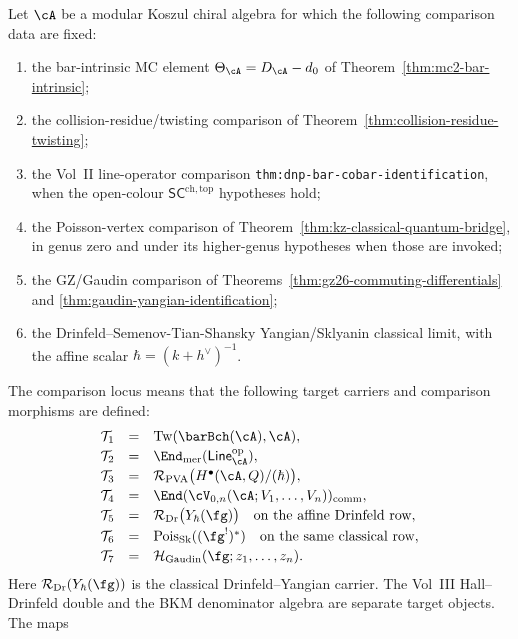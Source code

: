 \begin{theorem}
\label{thm:master-seven-face}
Let $\cA$ be a modular Koszul chiral algebra for which the following
comparison data are fixed:
\begin{enumerate}[label=\textup{(\alph*)}]
\item the bar-intrinsic MC element $\Theta_\cA=D_\cA-d_0$ of
Theorem~\ref{thm:mc2-bar-intrinsic};
\item the collision-residue/twisting comparison of
Theorem~\ref{thm:collision-residue-twisting};
\item the Vol~II line-operator comparison
\texttt{thm:dnp-bar-cobar-identification}, when the open-colour
$\mathsf{SC}^{\mathrm{ch,top}}$ hypotheses hold;
\item the Poisson-vertex comparison of
Theorem~\ref{thm:kz-classical-quantum-bridge}, in genus zero and
under its higher-genus hypotheses when those are invoked;
\item the GZ/Gaudin comparison of
Theorems~\ref{thm:gz26-commuting-differentials} and
\ref{thm:gaudin-yangian-identification};
\item the Drinfeld--Semenov-Tian-Shansky Yangian/Sklyanin
classical limit, with the affine scalar
$\hbar=(k+h^\vee)^{-1}$.
\end{enumerate}
The comparison locus means that the following target carriers and
comparison morphisms are defined:
\[
\begin{array}{rcl}
\mathcal T_1 &=& \mathrm{Tw}(\barBch(\cA),\cA),\\[2pt]
\mathcal T_2 &=&
 \End_{\mathrm{mer}}(\mathsf{Line}^{\mathrm{op}}_{\cA}),\\[2pt]
\mathcal T_3 &=&
 \mathcal R_{\mathrm{PVA}}\bigl(H^\bullet(\cA,Q)/(\hbar)\bigr),\\[2pt]
\mathcal T_4 &=&
 \End(\cV_{0,n}(\cA;V_1,\ldots,V_n))_{\mathrm{comm}},\\[2pt]
\mathcal T_5 &=&
 \mathcal R_{\mathrm{Dr}}\bigl(Y_\hbar(\fg)\bigr)
 \quad\text{on the affine Drinfeld row},\\[2pt]
\mathcal T_6 &=&
 \mathrm{Pois}_{\mathrm{Sk}}((\fg^!)^*)
 \quad\text{on the same classical row},\\[2pt]
\mathcal T_7 &=&
 \mathcal H_{\mathrm{Gaudin}}(\fg;z_1,\ldots,z_n).
\end{array}
\]
Here $\mathcal R_{\mathrm{Dr}}(Y_\hbar(\fg))$ is the classical
Drinfeld--Yangian carrier.  The Vol~III Hall--Drinfeld double and the
BKM denominator algebra are separate target objects.  The maps

\end{theorem}
